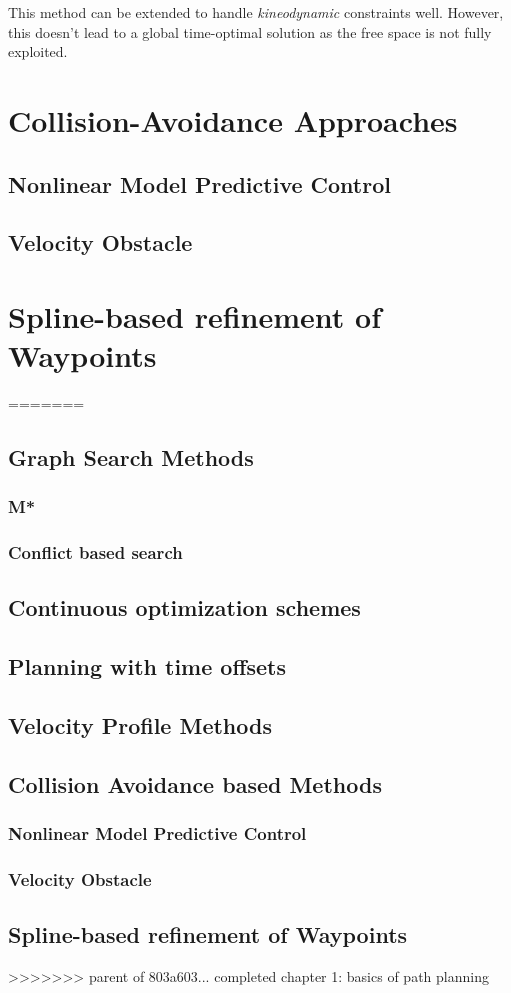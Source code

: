 This method can be extended to handle \textit{kineodynamic} constraints well. However, this doesn't lead to a global time-optimal solution as the free space is not fully exploited.
\section{Collision-Avoidance Approaches}
\subsection{Nonlinear Model Predictive Control}
\subsection{Velocity Obstacle}

\section{Spline-based refinement of Waypoints}
=======
 \subsection{Graph Search Methods}
 \subsubsection{M*}
 \subsubsection{Conflict based search}
 
 \subsection{Continuous optimization schemes}

 \subsection{Planning with time offsets}

 \subsection{Velocity Profile Methods}

 \subsection{Collision Avoidance based Methods}
 \subsubsection{Nonlinear Model Predictive Control}
 \subsubsection{Velocity Obstacle}

 \subsection{Spline-based refinement of Waypoints}
>>>>>>> parent of 803a603... completed chapter 1: basics of path planning
